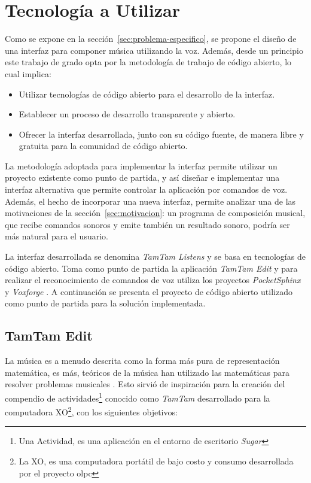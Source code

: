 
\section{Tecnolog\'ia a Utilizar}
\label{sec:tecnologia-utilizada}

Como se expone en la secci\'on~\ref{sec:problema-especifico}, se propone el dise\~no
de una interfaz para componer m\'usica utilizando la voz. Adem\'as, desde un principio
este trabajo de grado opta por la metodolog\'ia de trabajo
de c\'odigo abierto, lo cual implica: 

\begin{itemize}
    \item Utilizar tecnolog\'ias de c\'odigo abierto para el desarrollo de la interfaz.
    \item Establecer un proceso de desarrollo transparente y abierto.
    \item Ofrecer la interfaz desarrollada, junto con su c\'odigo fuente, de manera libre 
        y gratuita para la comunidad de c\'odigo abierto.
\end{itemize}

La metodolog\'ia adoptada para implementar la interfaz permite utilizar un proyecto
existente como punto de partida, y as\'i dise\~nar e implementar una interfaz alternativa que permite
controlar la aplicaci\'on por comandos de voz. Adem\'as,
el hecho de incorporar una nueva interfaz, permite analizar
una de las motivaciones de la secci\'on~\ref{sec:motivacion}: un programa de composici\'on
musical, que recibe comandos sonoros y emite tambi\'en un resultado sonoro, podr\'ia ser
m\'as natural para el usuario. 

La interfaz desarrollada se denomina \emph{TamTam Listens} y se basa en tecnolog\'ias de c\'odigo abierto.
Toma como punto de partida la aplicaci\'on \emph{TamTam Edit}
y para realizar el reconocimiento de comandos de voz utiliza los proyectos \emph{PocketSphinx} \cite{PocketSphinxHomePage} 
y \emph{Voxforge} \cite{Voxforge}.  A continuaci\'on se presenta el proyecto de c\'odigo abierto
utilizado como punto de partida para la soluci\'on implementada.

\subsection{TamTam Edit}
\label{sec:tamtam-edit}

La m\'usica es a menudo descrita como la forma m\'as pura de representaci\'on matem\'atica, es m\'as, te\'oricos de la
m\'usica han utilizado las matem\'aticas para resolver problemas musicales \cite{TheSoundOfNumbers}. Esto sirvi\'o
de inspiraci\'on para la creaci\'on del compendio de actividades\footnote{Una Actividad, es una aplicaci\'on en el entorno 
de escritorio \emph{Sugar}}
conocido como \emph{TamTam} desarrollado para la computadora XO\footnote{La XO, es una computadora 
port\'atil de bajo costo y consumo desarrollada por el proyecto \gls{olpc}},
con los siguientes objetivos:

